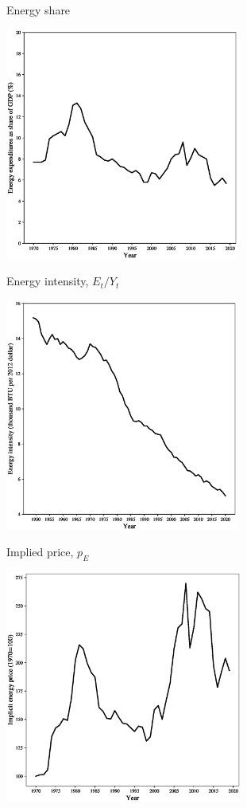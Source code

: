 \begin{frame}{Energy share}
\begin{center}
\includegraphics[height=3in]{../Figures/fig-ch10-fig1.eps}
\end{center}
\end{frame}

\begin{frame}{Energy intensity, $E_t/Y_t$}
\begin{center}
\includegraphics[height=3in]{../Figures/fig-ch10-fig2.eps}
\end{center}
\end{frame}

\begin{frame}{Implied price, $p_E$}
\begin{center}
\includegraphics[height=3in]{../Figures/fig-ch10-fig3.eps}
\end{center}
\end{frame}

